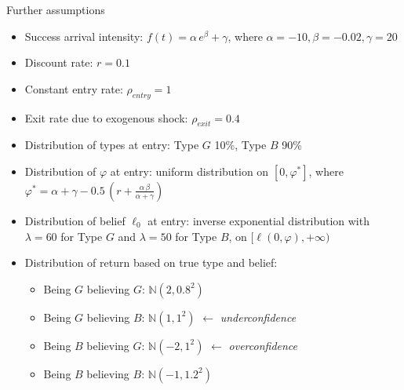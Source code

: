 \documentclass{beamer}
\begin{document}
\begin{frame}[allowframebreaks]{Further assumptions}
	\begin{itemize}
\item Success arrival intensity: $f(t)=\alpha \, e^\beta + \gamma$, where $\alpha = -10, \beta = -0.02, \gamma = 20$
\item Discount rate: $r = 0.1$
\item Constant entry rate: $\rho_{entry} = 1$
\item Exit rate due to exogenous shock: $\rho_{exit} = 0.4$
\end{itemize}

\framebreak

\begin{itemize}
\item Distribution of types at entry: Type $G$ 10\%, Type $B$ 90\%
\item Distribution of $\varphi$ at entry: uniform distribution on $[0, \varphi^*]$, where $\varphi^* = \alpha + \gamma - 0.5 \, (r + \frac{\alpha \, \beta}{\alpha + \gamma})$
\item Distribution of belief $\ell_0$ at entry: inverse exponential distribution with $\lambda = 60$ for Type $G$ and $\lambda = 50$ for Type $B$, on $[\ell(0, \varphi), +\infty)$
\item Distribution of return based on true type and belief:
\begin{itemize}
	\item Being $G$ believing $G$: $\mathbb N(2, 0.8^2)$
	\item Being $G$ believing $B$: $\mathbb N(1, 1^2)$
	$\leftarrow$ \textit{underconfidence}
	\item Being $B$ believing $G$: $\mathbb N(-2, 1^2)$
	$\leftarrow$ \textit{overconfidence}
	\item Being $B$ believing $B$: $\mathbb N(-1, 1.2^2)$
\end{itemize}
	\end{itemize}
\end{frame}
\end{document}
